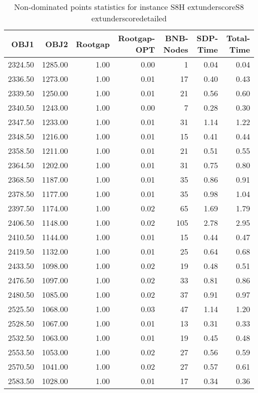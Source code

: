 \begin{table}
\caption{Non-dominated points statistics for instance S8H	extunderscoreS8	extunderscoredetailed}
\label{tab:plots/S8H_S8_detailed}
\begin{tabular}{rrrrrrr}
\toprule
OBJ1 & OBJ2 & Rootgap & Rootgap-OPT & BNB-Nodes & SDP-Time & Total-Time \\
\midrule
2324.50 & 1285.00 & 1.00 & 0.00 & 1 & 0.04 & 0.04 \\
2336.50 & 1273.00 & 1.00 & 0.01 & 17 & 0.40 & 0.43 \\
2339.50 & 1250.00 & 1.00 & 0.01 & 21 & 0.56 & 0.60 \\
2340.50 & 1243.00 & 1.00 & 0.00 & 7 & 0.28 & 0.30 \\
2347.50 & 1233.00 & 1.00 & 0.01 & 31 & 1.14 & 1.22 \\
2348.50 & 1216.00 & 1.00 & 0.01 & 15 & 0.41 & 0.44 \\
2358.50 & 1211.00 & 1.00 & 0.01 & 21 & 0.51 & 0.55 \\
2364.50 & 1202.00 & 1.00 & 0.01 & 31 & 0.75 & 0.80 \\
2368.50 & 1187.00 & 1.00 & 0.01 & 35 & 0.86 & 0.91 \\
2378.50 & 1177.00 & 1.00 & 0.01 & 35 & 0.98 & 1.04 \\
2397.50 & 1174.00 & 1.00 & 0.02 & 65 & 1.69 & 1.79 \\
2406.50 & 1148.00 & 1.00 & 0.02 & 105 & 2.78 & 2.95 \\
2410.50 & 1144.00 & 1.00 & 0.01 & 15 & 0.44 & 0.47 \\
2419.50 & 1132.00 & 1.00 & 0.01 & 25 & 0.64 & 0.68 \\
2433.50 & 1098.00 & 1.00 & 0.02 & 19 & 0.48 & 0.51 \\
2476.50 & 1097.00 & 1.00 & 0.02 & 33 & 0.81 & 0.86 \\
2480.50 & 1085.00 & 1.00 & 0.02 & 37 & 0.91 & 0.97 \\
2525.50 & 1068.00 & 1.00 & 0.03 & 47 & 1.14 & 1.20 \\
2528.50 & 1067.00 & 1.00 & 0.01 & 13 & 0.31 & 0.33 \\
2532.50 & 1063.00 & 1.00 & 0.01 & 19 & 0.45 & 0.48 \\
2553.50 & 1053.00 & 1.00 & 0.02 & 27 & 0.56 & 0.59 \\
2570.50 & 1041.00 & 1.00 & 0.02 & 27 & 0.57 & 0.61 \\
2583.50 & 1028.00 & 1.00 & 0.01 & 17 & 0.34 & 0.36 \\
\bottomrule
\end{tabular}
\end{table}
